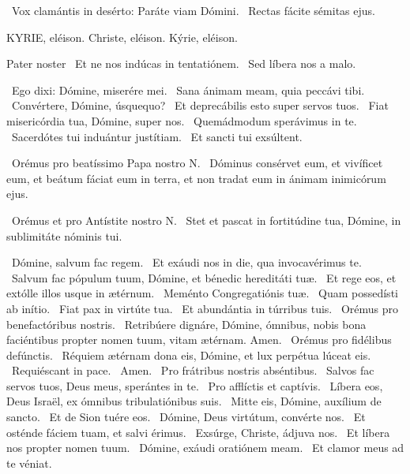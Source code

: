 \V\ Vox clamántis in desérto: Paráte viam Dómini. \R\ Rectas fácite sémitas ejus.



\label{feria3:precesferiales}

KYRIE, eléison. Christe, eléison. Kýrie, eléison.

Pater noster  \V\ Et ne nos indúcas in tentatiónem. \R\ Sed líbera nos a malo.

\V\ Ego dixi: Dómine, miserére mei. \R\ Sana ánimam meam, quia peccávi tibi. \V\ Convértere, Dómine, úsquequo? \R\ Et deprecábilis esto super servos tuos. \V\ Fiat misericórdia tua, Dómine, super nos. \R\ Quemádmodum sperávimus in te. \V\ Sacerdótes tui induántur justítiam. \R\ Et sancti tui exsúltent.

\V\ Orémus pro beatíssimo Papa nostro N. \R\ Dóminus consérvet eum, et vivíficet eum, et beátum fáciat eum in terra, et non tradat eum in ánimam inimicórum ejus.

\V\ Orémus et pro Antístite nostro N. \R\ Stet et pascat in fortitúdine tua, Dómine, in sublimitáte nóminis tui.

\V\ Dómine, salvum fac regem. \R\ Et exáudi nos in die, qua invocavérimus te. \V\ Salvum fac pópulum tuum, Dómine, et bénedic hereditáti tuæ. \R\ Et rege eos, et extólle illos usque in ætérnum. \V\ Meménto Congregatiónis tuæ. \R\ Quam possedísti ab inítio. \V\ Fiat pax in virtúte tua. \R\ Et abundántia in túrribus tuis. \V\ Orémus pro benefactóribus nostris. \R\ Retribúere dignáre, Dómine, ómnibus, nobis bona faciéntibus propter nomen tuum, vitam ætérnam. Amen. \V\ Orémus pro fidélibus defúnctis. \R\ Réquiem ætérnam dona eis, Dómine, et lux perpétua lúceat eis. \V\ Requiéscant in pace. \R\ Amen. \V\ Pro frátribus nostris abséntibus. \R\ Salvos fac servos tuos, Deus meus, sperántes in te. \V\ Pro afflíctis et captívis. \R\ Líbera eos, Deus Israël, ex ómnibus tribulatiónibus suis. \V\ Mitte eis, Dómine, auxílium de sancto. \R\ Et de Sion tuére eos. \V\ Dómine, Deus virtútum, convérte nos. \R\ Et osténde fáciem tuam, et salvi érimus. \V\ Exsúrge, Christe, ádjuva nos. \R\ Et líbera nos propter nomen tuum. \V\ Dómine, exáudi oratiónem meam. \R\ Et clamor meus ad te véniat.


